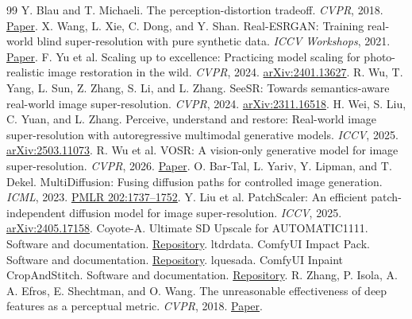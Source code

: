 \documentclass[10pt,twocolumn]{article}
\begin{document}
\begin{thebibliography}{99}\small
{} Y. Blau and T. Michaeli. The perception-distortion tradeoff. \emph{CVPR}, 2018. \href{https://openaccess.thecvf.com/content_cvpr_2018/html/Blau_The_Perception-Distortion_Tradeoff_CVPR_2018_paper.html}{Paper}.
 X. Wang, L. Xie, C. Dong, and Y. Shan. Real-ESRGAN: Training real-world blind super-resolution with pure synthetic data. \emph{ICCV Workshops}, 2021. \href{https://openaccess.thecvf.com/content/ICCV2021W/AIM/html/Wang_Real-ESRGAN_Training_Real-World_Blind_Super-Resolution_With_Pure_Synthetic_Data_ICCVW_2021_paper.html}{Paper}.
 F. Yu et al. Scaling up to excellence: Practicing model scaling for photo-realistic image restoration in the wild. \emph{CVPR}, 2024. \href{https://arxiv.org/abs/2401.13627}{arXiv:2401.13627}.
 R. Wu, T. Yang, L. Sun, Z. Zhang, S. Li, and L. Zhang. SeeSR: Towards semantics-aware real-world image super-resolution. \emph{CVPR}, 2024. \href{https://arxiv.org/abs/2311.16518}{arXiv:2311.16518}.
 H. Wei, S. Liu, C. Yuan, and L. Zhang. Perceive, understand and restore: Real-world image super-resolution with autoregressive multimodal generative models. \emph{ICCV}, 2025. \href{https://arxiv.org/abs/2503.11073}{arXiv:2503.11073}.
 R. Wu et al. VOSR: A vision-only generative model for image super-resolution. \emph{CVPR}, 2026. \href{https://openaccess.thecvf.com/content/CVPR2026/html/Wu_VOSR_A_Vision-Only_Generative_Model_for_Image_Super-Resolution_CVPR_2026_paper.html}{Paper}.
 O. Bar-Tal, L. Yariv, Y. Lipman, and T. Dekel. MultiDiffusion: Fusing diffusion paths for controlled image generation. \emph{ICML}, 2023. \href{https://proceedings.mlr.press/v202/bar-tal23a.html}{PMLR 202:1737--1752}.
 Y. Liu et al. PatchScaler: An efficient patch-independent diffusion model for image super-resolution. \emph{ICCV}, 2025. \href{https://arxiv.org/abs/2405.17158}{arXiv:2405.17158}.
 Coyote-A. Ultimate SD Upscale for AUTOMATIC1111. Software and documentation. \href{https://github.com/Coyote-A/ultimate-upscale-for-automatic1111}{Repository}.
 ltdrdata. ComfyUI Impact Pack. Software and documentation. \href{https://github.com/ltdrdata/ComfyUI-Impact-Pack}{Repository}.
 lquesada. ComfyUI Inpaint CropAndStitch. Software and documentation. \href{https://github.com/lquesada/ComfyUI-Inpaint-CropAndStitch}{Repository}.
 R. Zhang, P. Isola, A. A. Efros, E. Shechtman, and O. Wang. The unreasonable effectiveness of deep features as a perceptual metric. \emph{CVPR}, 2018. \href{https://openaccess.thecvf.com/content_cvpr_2018/html/Zhang_The_Unreasonable_Effectiveness_CVPR_2018_paper.html}{Paper}.
\end{thebibliography}
\end{document}
